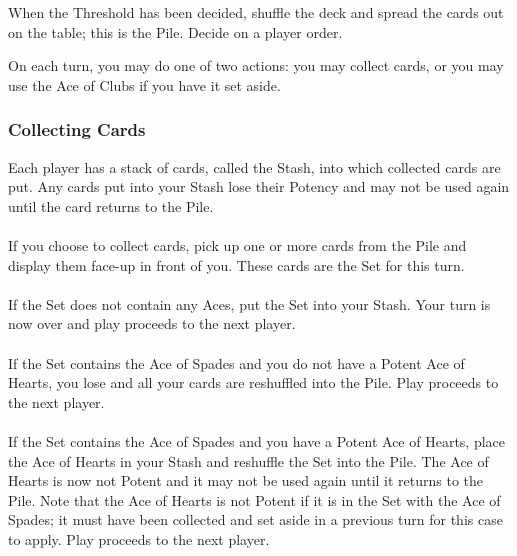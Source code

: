 \documentclass{article}
\begin{document}
When the Threshold has been decided, shuffle the deck and spread the
cards out on the table; this is the Pile. Decide on a player order.

On each turn, you may do one of two actions: you may collect cards, or
you may use the Ace of Clubs if you have it set aside.

\subsubsection{Collecting Cards \label{sec:collecting}}


Each player has a stack of cards, called the Stash, into which collected
cards are put. Any cards put into your Stash lose their Potency and may
not be used again until the card returns to the Pile.

\paragraph{\label{par:set}}

If you choose to collect cards, pick up one or more cards from the Pile
and display them face-up in front of you. These cards are the Set for
this turn.

\paragraph{\label{par:setnoace}}
If the Set does not contain any Aces, put the Set into your Stash.
Your turn is now over and play proceeds to the next player. 

\paragraph{\label{par:setspadenoheart}}
If the Set contains the Ace of Spades and you do not have a Potent Ace
of Hearts, you lose and all your cards are reshuffled into the Pile.
Play proceeds to the next player.

\paragraph{\label{par:spadeshearts}}
If the Set contains the Ace of Spades and you have a Potent Ace of
Hearts, place the Ace of Hearts in your Stash and reshuffle the Set into
the Pile. The Ace of Hearts is now not Potent and it may not be used
again until it returns to the Pile. Note that the Ace of Hearts is not
Potent if it is in the Set with the Ace of Spades; it must have been
collected and set aside in a previous turn for this case to apply. Play
proceeds to the next player.
\end{document}
